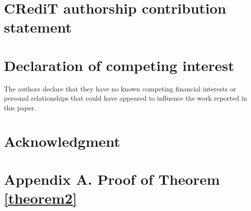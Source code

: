 \documentclass[preprint,12pt,authoryear]{elsarticle}
\theoremstyle{definition}
\begin{document}
\section*{CRediT authorship contribution statement}
 

\section*{Declaration of competing interest}

The authors declare that they have no known competing financial interests or personal relationships that could have appeared to influence the work reported in this paper.

\section*{Acknowledgment}


\appendix
\section*{Appendix A. Proof of Theorem \ref{theorem2}}
\end{document}
